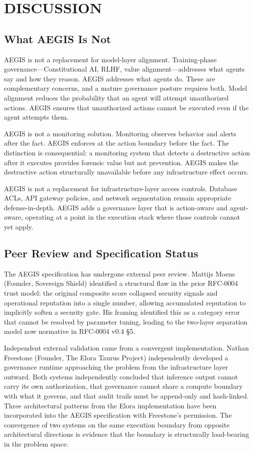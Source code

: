 \documentclass{IEEEcsmag}
\begin{document}
\section{DISCUSSION}

\subsection{What AEGIS Is Not}

AEGIS is not a replacement for model-layer alignment. Training-phase governance---Constitutional AI, RLHF, value alignment---addresses what agents say and how they reason. AEGIS addresses what agents do. These are complementary concerns, and a mature governance posture requires both. Model alignment reduces the probability that an agent will attempt unauthorized actions. AEGIS ensures that unauthorized actions cannot be executed even if the agent attempts them.

AEGIS is not a monitoring solution. Monitoring observes behavior and alerts after the fact. AEGIS enforces at the action boundary before the fact. The distinction is consequential: a monitoring system that detects a destructive action after it executes provides forensic value but not prevention. AEGIS makes the destructive action structurally unavailable before any infrastructure effect occurs.

AEGIS is not a replacement for infrastructure-layer access controls. Database ACLs, API gateway policies, and network segmentation remain appropriate defense-in-depth. AEGIS adds a governance layer that is action-aware and agent-aware, operating at a point in the execution stack where those controls cannot yet apply.

\subsection{Peer Review and Specification Status}

The AEGIS specification has undergone external peer review. Mattijs Moens (Founder, Sovereign Shield) identified a structural flaw in the prior RFC-0004 trust model: the original composite score collapsed security signals and operational reputation into a single number, allowing accumulated reputation to implicitly soften a security gate. His framing identified this as a category error that cannot be resolved by parameter tuning, leading to the two-layer separation model now normative in RFC-0004 v0.4 \S5.

Independent external validation came from a convergent implementation. Nathan Freestone (Founder, The Elora Taurus Project) independently developed a governance runtime approaching the problem from the infrastructure layer outward. Both systems independently concluded that inference output cannot carry its own authorization, that governance cannot share a compute boundary with what it governs, and that audit trails must be append-only and hash-linked. Three architectural patterns from the Elora implementation have been incorporated into the AEGIS specification with Freestone's permission. The convergence of two systems on the same execution boundary from opposite architectural directions is evidence that the boundary is structurally load-bearing in the problem space.
\end{document}
